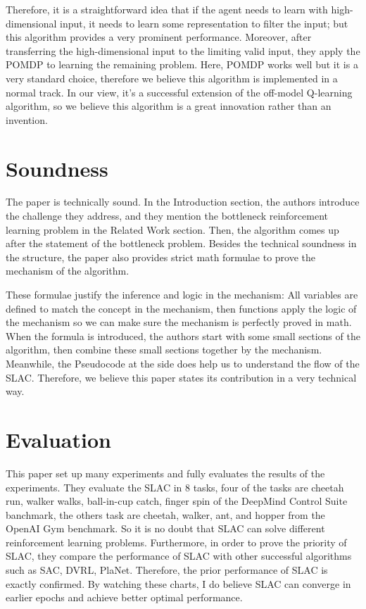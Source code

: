 \documentclass[letterpaper]{article} %
\begin{document}
Therefore, it is a straightforward idea that if the agent needs to learn with high-dimensional input, it needs to learn some representation to filter the input; but this algorithm provides a very prominent performance. Moreover, after transferring the high-dimensional input to the limiting valid input, they apply the POMDP to learning the remaining problem. Here, POMDP works well but it is a very standard choice, therefore we believe this algorithm is implemented in a normal track. In our view, it’s a successful extension of the off-model  Q-learning algorithm, so we believe this algorithm is a great innovation rather than an invention.

\section{Soundness}

The paper is technically sound. In the Introduction section, the authors introduce the challenge they address, and they mention the bottleneck reinforcement learning problem in the Related Work section. Then, the algorithm comes up after the statement of the bottleneck problem. Besides the technical soundness in the structure, the paper also provides strict math formulae to prove the mechanism of the algorithm. 

These formulae justify the inference and logic in the mechanism: All variables are defined to match the concept in the mechanism, then functions apply the logic of the mechanism so we can make sure the mechanism is perfectly proved in math.  When the formula is introduced, the authors start with some small sections of the algorithm, then combine these small sections together by the mechanism. Meanwhile, the Pseudocode at the side does help us to understand the flow of the SLAC. Therefore, we believe this paper states its contribution in a very technical way.

\section{Evaluation}

This paper set up many experiments and fully evaluates the results of the experiments. They evaluate the SLAC in 8 tasks, four of the tasks are cheetah run, walker walks, ball-in-cup catch, finger spin of the DeepMind Control Suite banchmark\cite{tassa2018deepmind}, the others task are cheetah, walker, ant, and hopper from the OpenAI Gym benchmark\cite{brockman2016openai}. So it is no doubt that SLAC can solve different reinforcement learning problems. Furthermore, in order to prove the priority of SLAC, they compare the performance of SLAC with other successful algorithms such as SAC, DVRL, PlaNet. Therefore, the prior performance of SLAC is exactly confirmed. By watching these charts, I do believe SLAC can converge in earlier epochs and achieve better optimal performance. 
\end{document}
